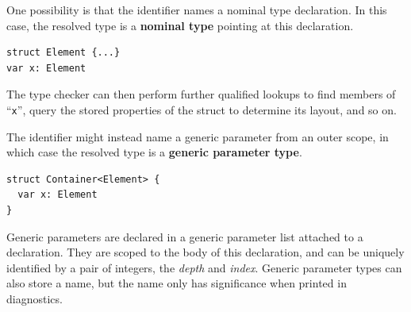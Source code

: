 \documentclass[../generics]{subfiles}
\begin{document}
\begin{figure}
\end{figure}

\medskip

One possibility is that the identifier names a nominal type declaration. In this case, the resolved type is a \textbf{nominal type} pointing at this declaration.

\medskip
\noindent
\begin{minipage}{26.5em}
\begin{Verbatim}
struct Element {...}
var x: Element
\end{Verbatim}
\end{minipage}
\medskip

The type checker can then perform further qualified lookups to find members of ``\texttt{x}'', query the stored properties of the struct to determine its layout, and so on.

\begin{figure}
\end{figure}

\medskip

The identifier might instead name a generic parameter from an outer scope, in which case the resolved type is a \textbf{generic parameter type}.

\medskip

\noindent
\begin{minipage}{25.5em}
\begin{Verbatim}
struct Container<Element> {
  var x: Element
}
\end{Verbatim}
\end{minipage}
\medskip

Generic parameters are declared in a generic parameter list attached to a declaration. They are scoped to the body of this declaration, and can be uniquely identified by a pair of integers, the \emph{depth} and \emph{index}. Generic parameter types can also store a name, but the name only has significance when printed in diagnostics.
\end{document}
